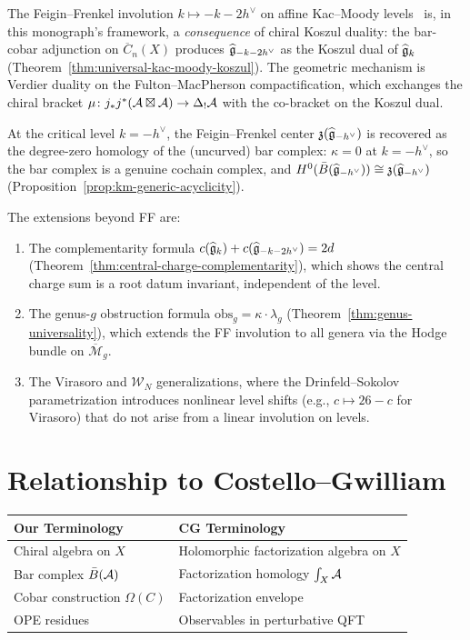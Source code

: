 \begin{remark}\label{rem:feigin-frenkel-comparison}
The Feigin--Frenkel involution $k \mapsto -k - 2h^\vee$ on affine
Kac--Moody levels~\cite{Feigin-Frenkel} is, in this monograph's framework,
a \emph{consequence} of chiral Koszul duality: the bar-cobar adjunction on
$\overline{C}_n(X)$ produces $\widehat{\mathfrak{g}}_{-k-2h^\vee}$ as the Koszul
dual of $\widehat{\mathfrak{g}}_k$ (Theorem~\ref{thm:universal-kac-moody-koszul}).
The geometric mechanism is Verdier duality on the Fulton--MacPherson
compactification, which exchanges the chiral bracket
$\mu\colon j_*j^*(\mathcal{A} \boxtimes \mathcal{A}) \to \Delta_!\mathcal{A}$
with the co-bracket on the Koszul dual.

At the critical level $k = -h^\vee$, the Feigin--Frenkel center
$\mathfrak{z}(\widehat{\mathfrak{g}}_{-h^\vee})$ is recovered as the degree-zero
homology of the (uncurved) bar complex: $\kappa = 0$ at $k = -h^\vee$,
so the bar complex is a genuine cochain complex, and
$H^0(\bar{B}(\widehat{\mathfrak{g}}_{-h^\vee})) \cong \mathfrak{z}(\widehat{\mathfrak{g}}_{-h^\vee})$
(Proposition~\ref{prop:km-generic-acyclicity}).

The extensions beyond FF are:
\begin{enumerate}[label=(\roman*)]
\item The complementarity formula $c(\widehat{\mathfrak{g}}_k) + c(\widehat{\mathfrak{g}}_{-k-2h^\vee}) = 2d$
  (Theorem~\ref{thm:central-charge-complementarity}), which shows the
  central charge sum is a root datum invariant, independent of the level.
\item The genus-$g$ obstruction formula $\mathrm{obs}_g = \kappa \cdot \lambda_g$
  (Theorem~\ref{thm:genus-universality}), which extends the FF involution
  to all genera via the Hodge bundle on $\overline{\mathcal{M}}_g$.
\item The Virasoro and $\mathcal{W}_N$ generalizations, where the
  Drinfeld--Sokolov parametrization introduces nonlinear level shifts
  (e.g., $c \mapsto 26 - c$ for Virasoro) that do not arise from a linear
  involution on levels.
\end{enumerate}
\end{remark}


\section{Relationship to Costello--Gwilliam}

\begin{tabular}{>{\raggedright\arraybackslash}p{}>{\raggedright\arraybackslash}p{}}
\textbf{Our Terminology} & \textbf{CG Terminology} \\
\hline
Chiral algebra on $X$ & Holomorphic factorization algebra on $X$ \\
Bar complex $\bar{B}(\mathcal{A})$ & Factorization homology $\int_X \mathcal{A}$ \\
Cobar construction $\Omega(C)$ & Factorization envelope \\
OPE residues & Observables in perturbative QFT \\
\end{tabular}

